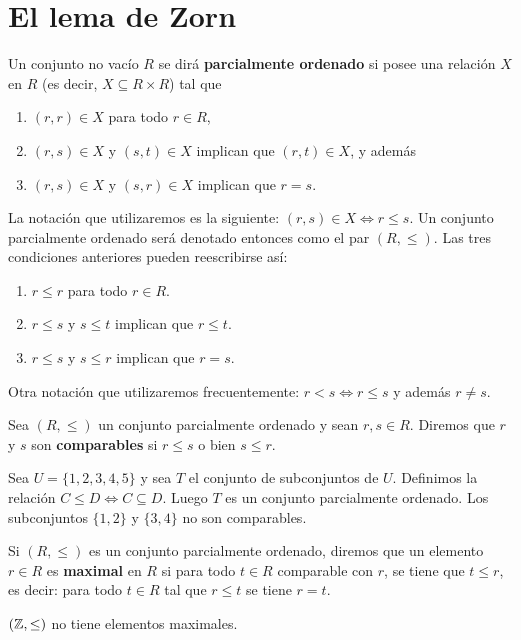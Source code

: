\chapter{El lema de Zorn}

Un conjunto no vacío $R$ se dirá \textbf{parcialmente ordenado} si posee una relación $X$ en $R$ (es decir, $X\subseteq R\times R$)
tal que 
\begin{enumerate}   	
\item $(r,r)\in X$ para todo $r\in R$,
\item $(r,s)\in X$ y $(s,t)\in X$ implican que $(r,t)\in X$, y además
\item $(r,s)\in X$ y $(s,r)\in X$ implican que $r=s$.
\end{enumerate}

La notación que utilizaremos es la siguiente: $(r,s)\in X\Longleftrightarrow r\leq s$. Un conjunto parcialmente ordenado será denotado entonces como el par $(R,\leq)$. Las 
tres condiciones anteriores pueden reescribirse así:
\begin{enumerate}
\item $r\leq r$ para todo $r\in R$.
\item $r\leq s$ y $s\leq t$ implican que $r\leq t$.
\item $r\leq s$ y $s\leq r$ implican que $r=s$.
\end{enumerate}

Otra notación que utilizaremos frecuentemente: $r<s\Longleftrightarrow r\leq s$ y además $r\ne s$.

Sea $(R,\leq)$ un conjunto parcialmente ordenado y sean $r,s\in R$. Diremos que $r$ y $s$ son \textbf{comparables}
si $r\leq s$ o bien $s\leq r$. 	

\begin{example}
Sea $U=\{1,2,3,4,5\}$ y sea $T$ el conjunto de subconjuntos de $U$. Definimos 
la relación $C\leq D\Longleftrightarrow C\subseteq D$. Luego $T$ es un conjunto parcialmente ordenado. Los
subconjuntos $\{1,2\}$ y $\{3,4\}$ no son comparables. 
\end{example}

Si $(R,\leq)$ es un conjunto parcialmente ordenado, diremos que un elemento $r\in R$ es \textbf{maximal} en $R$ 
si para todo $t\in R$ comparable con $r$, se tiene que $t\leq r$, es decir: para todo $t\in R$ tal que $r\leq t$ se tiene $r=t$. 	

\begin{example}
$(\mathbb{Z},\leq)$ no tiene elementos maximales.
\end{example}

